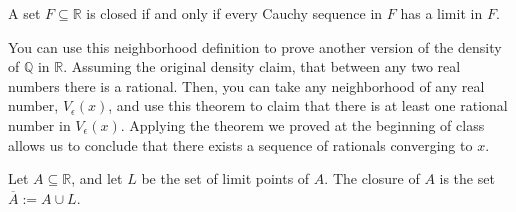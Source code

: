 \documentclass{ximera}
\begin{document}
\begin{theorem}
    A set $F\subseteq \mathbb{R}$ is closed if and only if every Cauchy sequence in $F$ has a limit in $F$.
\end{theorem}

You can use this neighborhood definition to prove another version of the density of $\mathbb{Q}$ in $\mathbb{R}$.  Assuming the original density claim, that between any two real numbers there is a rational.  Then, you can take any neighborhood of any real number, $V_\epsilon(x)$, and use this theorem to claim that there is at least one rational number in $V_\epsilon(x)$.  Applying the theorem we proved at the beginning of class allows us to conclude that there exists a sequence of rationals converging to $x$.

\begin{definition}
    Let $A\subseteq \mathbb{R}$, and let $L$ be the set of limit points of $A$.  The closure of $A$ is the set $\overline{A}:= A\cup L$.
\end{definition}

    
\end{document}
